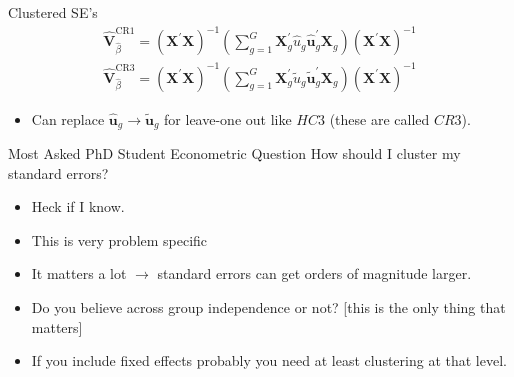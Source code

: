 \documentclass[aspectratio=169,11pt]{beamer}
\begin{document}
\begin{frame}{Clustered SE's}
\begin{align*}
\widehat { \boldsymbol { V } } _ { \hat { \beta } } ^ { \mathrm { CR } 1 } = \left( \boldsymbol { X } ^ { \prime } \boldsymbol { X } \right) ^ { - 1 } \left( \sum _ { g = 1 } ^ { G } \boldsymbol { X } _ { g } ^ { \prime } \widehat { u } _ { g } \widehat { \boldsymbol { u } } _ { g } ^ { \prime } \boldsymbol { X } _ { g } \right) \left( \boldsymbol { X } ^ { \prime } \boldsymbol { X } \right) ^ { - 1 }\\
\widehat { \boldsymbol { V } } _ { \hat { \beta } } ^ { \mathrm { CR } 3 } = \left( \boldsymbol { X } ^ { \prime } \boldsymbol { X } \right) ^ { - 1 } \left( \sum _ { g = 1 } ^ { G } \boldsymbol { X } _ { g } ^ { \prime } \widetilde { u } _ { g } \widetilde { \boldsymbol { u } } _ { g } ^ { \prime } \boldsymbol { X } _ { g } \right) \left( \boldsymbol { X } ^ { \prime } \boldsymbol { X } \right) ^ { - 1 }
\end{align*}
\begin{itemize}
\item Can replace  $\hat { \mathbf{u}}_g  \rightarrow \tilde { \mathbf{u}}_g $ for leave-one out like $HC3$ (these are called $CR3$).
\end{itemize}
\end{frame}




\begin{frame}{Most Asked PhD Student Econometric Question}
 How should I cluster my standard errors?
\begin{itemize}
\item Heck if I know.
\item This is very problem specific
\item It matters a lot $\rightarrow$ standard errors can get orders of magnitude larger.
\item Do you believe across group independence or not? [this is the only thing that matters]
\item If you include \alert{fixed effects} probably you need at least clustering at that level.
\end{itemize}
\end{frame}
\end{document}
